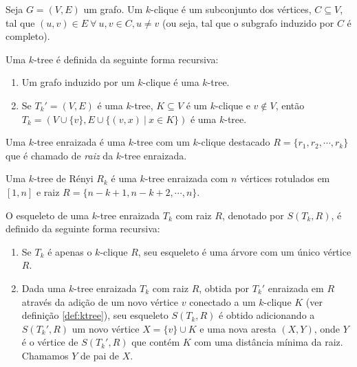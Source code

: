 \begin{definition}[$k$-clique]
  \label{def:kclique}
  \cite{defkclique} Seja $G = (V, E)$ um grafo. Um $k$-clique é um subconjunto dos vértices, $C \subseteq V$, tal que $(u, v) \in E \ \forall \ u, v \in C, u \neq v$ (ou seja, tal que o subgrafo induzido por $C$ é completo).
\end{definition}

\begin{definition}
  \label{def:ktree}
  \cite{harary} Uma $k$-tree é definida da seguinte forma recursiva:

  \begin{enumerate}
    \item Um grafo induzido por um $k$-clique é uma $k$-tree.
    \item Se $T_k' = (V, E)$ é uma $k$-tree, $K \subseteq V$ é um $k$-clique e $v \not \in V$, então $T_k = (V \cup \{v\}, E \cup \{(v,x) \ | \  x \in K\})$ é uma $k$-tree.
  \end{enumerate}

  Uma $k$-tree enraizada é uma $k$-tree com um $k$-clique destacado $R = \{r_1, r_2, \cdots, r_k\}$ que é chamado de \emph{raiz} da $k$-tree enraizada.
\end{definition}

\begin{definition}
  \cite{renyi} Uma $k$-tree de Rényi $R_k$ é uma $k$-tree enraizada com $n$ vértices rotulados em $[1, n]$ e raiz $R = \{n-k+1, n-k+2, \cdots, n\}$.
\end{definition}

\begin{definition}
  \label{def:skeleton}
  \cite{caminiti} O esqueleto de uma $k$-tree enraizada $T_k$ com raiz $R$, denotado por $S(T_k, R)$, é definido da seguinte forma recursiva:

  \begin{enumerate}
    \item Se $T_k$ é apenas o $k$-clique $R$, seu esqueleto é uma árvore com um único vértice $R$.
    \item Dada uma $k$-tree enraizada $T_k$ com raiz $R$, obtida por $T_k'$ enraizada em $R$ através da adição de um novo vértice $v$ conectado a um $k$-clique $K$ (ver definição \ref{def:ktree}), seu esqueleto $S(T_k, R)$ é obtido adicionando a $S(T_k', R)$ um novo vértice $X = \{v\} \cup K$ e uma nova aresta $(X, Y)$, onde $Y$ é o vértice de $S(T_k', R)$ que contém $K$ com uma distância mínima da raiz. Chamamos $Y$ de pai de $X$.
  \end{enumerate}
\end{definition}

